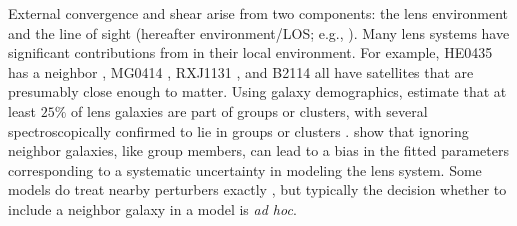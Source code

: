 External convergence and shear arise from two components: the lens environment and the line of sight (hereafter environment/LOS; e.g., \citealt{Jaroszynski14,Seljak94,Bar-Kana96,Keeton97}). Many lens systems have significant contributions from in their local environment. For example, HE0435 has a neighbor \citep{Kochanek06}, MG0414 \citep{Tonry99}, RXJ1131 \citep{Sluse03}, and B2114 \citep{King99} all have satellites that are presumably close enough to matter. Using galaxy demographics, \citet{Keeton00} estimate that at least $25\%$ of lens galaxies are part of groups or clusters, with several spectroscopically confirmed to lie in groups or clusters \citep[][and references therein]{Momcheva06}. \citet{Keeton04} show that ignoring neighbor galaxies, like group members, can lead to a bias in the fitted  parameters corresponding to a systematic uncertainty in modeling the lens system. Some models do treat nearby perturbers exactly \citep[e.g.][]{Fadely12}, but typically the decision whether to include a neighbor galaxy in a model is \textit{ad hoc}.
  